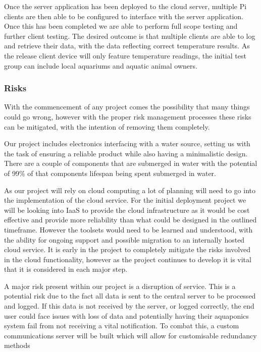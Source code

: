 \documentclass[11pt, oneside, a4paper, titlepage]{article}
\begin{document}
Once the server application has been deployed to the cloud server, multiple Pi clients are then able to be configured to interface with the server application. Once this has been completed we are able to perform full scope testing and further client testing. The desired outcome is that multiple clients are able to log and retrieve their data, with the data reflecting correct temperature results. As the release client device will only feature temperature readings, the initial test group can include local aquariums and aquatic animal owners. 

\subsubsection{Risks}
With the commencement of any project comes the possibility that many things could go wrong, however with the proper risk management processes these risks can be mitigated, with the intention of removing them completely.

Our project includes electronics interfacing with a water source, setting us with the task of ensuring a reliable product while also having a minimalistic design. There are a couple of components that are submerged in water with the potential of 99\% of that components lifespan being spent submerged in water.

As our project will rely on cloud computing a lot of planning will need to go into the implementation of the cloud service. For the initial deployment project we will be looking into IaaS to provide the cloud infrastructure as it would be cost effective and provide more reliability than what could be designed in the outlined timeframe. However the toolsets would need to be learned and understood, with the ability for ongoing support and possible migration to an internally hosted cloud service. It is early in the project to completely mitigate the risks involved in the cloud functionality, however as the project continues to develop it is vital that it is considered in each major step.

A major risk present within our project is a disruption of service. This is a potential risk due to the fact all data is sent to the central server to be processed and logged. If this data is not received by the server, or logged correctly, the end user could face issues with loss of data and potentially having their aquaponics system fail from not receiving a vital notification. To combat this, a custom communications server will be built which will allow for customisable redundancy methods 
\end{document}
